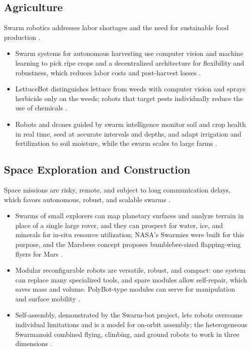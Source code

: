 \subsection{Agriculture}

Swarm robotics addresses labor shortages and the need for sustainable food
production \cite{bhowmick2024bio,seebacher2025collective}.
\begin{itemize}
  \item {} Swarm systems for autonomous harvesting
        use computer vision and machine learning to pick ripe crops and a
        decentralized architecture for flexibility and robustness, which reduces
        labor costs and post-harvest losses \cite{bhowmick2024bio}.
  \item {} LettuceBot distinguishes lettuce from weeds with
        computer vision and sprays herbicide only on the weeds; robots that
        target pests individually reduce the use of chemicals
        \cite{bhowmick2024bio}.
  \item {} Robots and drones guided by swarm
        intelligence monitor soil and crop health in real time, seed at accurate
        intervals and depths, and adapt irrigation and fertilization to soil
        moisture, while the swarm scales to large farms
        \cite{bhowmick2024bio,seebacher2025collective}.
\end{itemize}

\subsection{Space Exploration and Construction}

Space missions are risky, remote, and subject to long communication delays,
which favors autonomous, robust, and scalable swarms \cite{shahzad2023review}.
\begin{itemize}
  \item {} Swarms of small explorers can
        map planetary surfaces and analyze terrain in place of a single large
        rover, and they can prospect for water, ice, and minerals for in-situ
        resource utilization; NASA's Swarmies were built for this purpose, and the
        Marsbees concept proposes bumblebee-sized flapping-wing flyers for Mars
        \cite{shahzad2023review}.
  \item {} Modular reconfigurable robots are versatile,
        robust, and compact: one system can replace many specialized tools, and
        spare modules allow self-repair, which saves mass and volume. PolyBot-type
        modules can serve for manipulation and surface mobility
        \cite{yim2003modular,yim2007modular}.
  \item {} Self-assembly, demonstrated by the
        Swarm-bot project, lets robots overcome individual limitations and is a
        model for on-orbit assembly; the heterogeneous Swarmanoid combined
        flying, climbing, and ground robots to work in three dimensions
        \cite{gross2006object,hamann2018swarm}.
\end{itemize}

